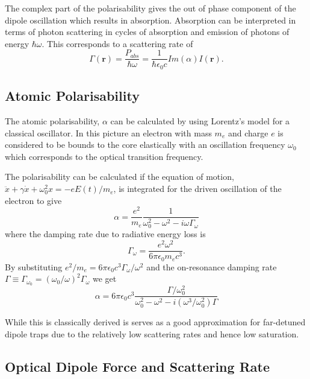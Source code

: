 The complex part of the polarisability gives the out of phase component of the dipole oscillation which results in absorption. Absorption can be interpreted in terms of photon scattering in cycles of absorption and emission of photons of energy $\hbar \omega$. This corresponds to a scattering rate of
\begin{equation}\label{eq:scattering_rate}
\Gamma(\boldsymbol r) = \frac{P_{abs}}{\hbar \omega} = \frac{1}{\hbar \epsilon_0 c} Im(\alpha) I(\boldsymbol r).
\end{equation}

\subsection{Atomic Polarisability}

The atomic polarisability, $\alpha$ can be calculated by using Lorentz's model for a classical oscillator. In this picture an electron with mass $m_e$ and charge $e$ is considered to be bounds to the core elastically with an oscillation frequency $\omega_0$ which corresponds to the optical transition frequency.

The polarisability can be calculated if the equation of motion, $\ddot{x} + \gamma \dot{x} + \omega_0^2 x = -eE(t)/m_e$, is integrated for the driven oscillation of the electron to give
\begin{equation} \label{eq:polarisability}
\alpha = \frac{e^2}{m_e} \frac{1}{\omega_0^2-\omega^2-i\omega\Gamma_\omega}
\end{equation}
where the damping rate due to radiative energy loss is
\begin{equation}\label{eq:damping_rate}
\Gamma_\omega=\frac{e^2\omega^2}{6\pi\epsilon_0m_ec^3}.
\end{equation}
By substituting $e^2/m_e=6\pi\epsilon_0 c^3\Gamma_\omega / \omega^2$ and the on-resonance damping rate $\Gamma \equiv \Gamma_{\omega_0} = (\omega_0/\omega)^2\Gamma_\omega$ we get
\begin{equation}\label{eq:final_polarisability}
\alpha = 6\pi \epsilon_0 c^3 \frac{\Gamma/\omega_0^2}{\omega_0^2 - \omega^2 - i(\omega^3/\omega_0^2)\Gamma}
\end{equation}

While this is classically derived is serves as a good approximation for far-detuned dipole traps due to the relatively low scattering rates and hence low saturation\cite{grimm_optical_2000}.

\subsection{Optical Dipole Force and Scattering Rate}

